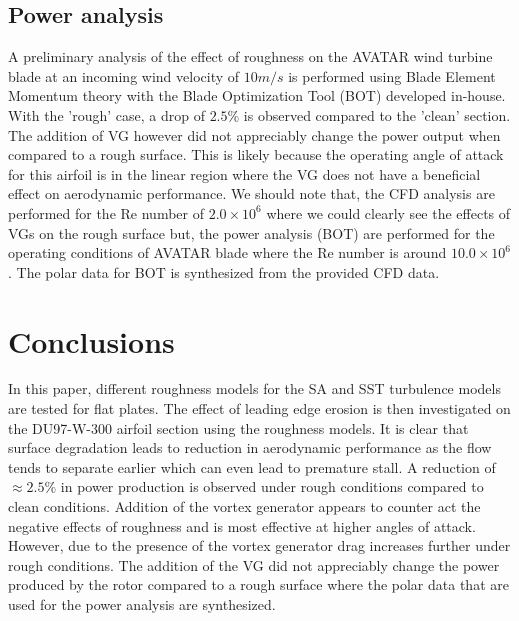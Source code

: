 \subsection{Power analysis}
A preliminary analysis of the effect of roughness on the AVATAR wind turbine blade\cite{Avatarwebsite} at an incoming wind velocity of $10 m/s$ is performed using Blade Element Momentum theory with the Blade Optimization Tool (BOT) developed in-house. With the 'rough' case, a drop of $2.5\%$ is observed compared to the 'clean' section. The addition of VG however did not appreciably change the power output when compared to a rough surface. This is likely because the operating angle of attack for this airfoil is in the linear region where the VG does not have a beneficial effect on aerodynamic performance. We should note that, the CFD analysis are performed for the Re number of $2.0 \times 10^6$ where we could clearly see the effects of VGs on the rough surface but, the power analysis (BOT) are performed for the operating conditions of AVATAR blade where the Re number is around $10.0 \times 10^6$. The polar data for BOT is synthesized from the provided CFD data.

\section{Conclusions}
In this paper, different roughness models for the SA and SST turbulence models are tested for flat plates. The effect of leading edge erosion is then investigated on the DU97-W-300 airfoil section using the roughness models. It is clear that surface degradation leads to reduction in aerodynamic performance as the flow tends to separate earlier which can even lead to premature stall. A reduction of $\approx 2.5\%$ in power production is observed under rough conditions compared to clean conditions. Addition of the vortex generator appears to counter act the negative effects of roughness and is most effective at higher angles of attack. However, due to the presence of the vortex generator drag increases further under rough conditions. The addition of the VG did not appreciably change the power produced by the rotor compared to a rough surface where the polar data that are used for the power analysis are synthesized.




